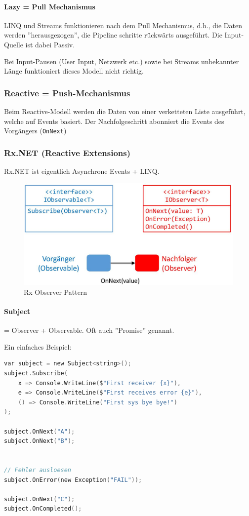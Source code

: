 \paragraph{Lazy = Pull Mechanismus}

LINQ und Streams funktionieren nach dem Pull Mechanismus, d.h., die Daten werden ''herausgezogen'', die Pipeline schritte rückwärts ausgeführt. Die Input-Quelle ist dabei Passiv.

Bei Input-Pausen (User Input, Netzwerk etc.) sowie bei Streams unbekannter Länge funktioniert dieses Modell nicht richtig.

\subsubsection{Reactive = Push-Mechanismus}

Beim Reactive-Modell werden die Daten von einer verketteten Liste ausgeführt, welche auf Events basiert. Der Nachfolgeschritt abonniert die Events des Vorgängers (\lstinline|OnNext|)

\subsubsection{Rx.NET (Reactive Extensions)}

Rx.NET ist eigentlich Asynchrone Events + LINQ.

\begin{figure}
	\centering
	\includegraphics[width=0.7\linewidth]{img/rx_observer_pattern}
	\caption{Rx Observer Pattern}
	\label{fig:rxobserverpattern}
\end{figure}


\paragraph{Subject} = Observer + Observable. Oft auch ''Promise'' genannt.

Ein einfaches Beispiel:

\begin{lstlisting}[language=C]
var subject = new Subject<string>();
subject.Subscribe(
	x => Console.WriteLine($"First receiver {x}"),
	e => Console.WriteLine($"First receives error {e}"),
	() => Console.WriteLine("First sys bye bye!")
);

subject.OnNext("A");
subject.OnNext("B");


// Fehler ausloesen
subject.OnError(new Exception("FAIL"));

subject.OnNext("C");
subject.OnCompleted();

\end{lstlisting}


